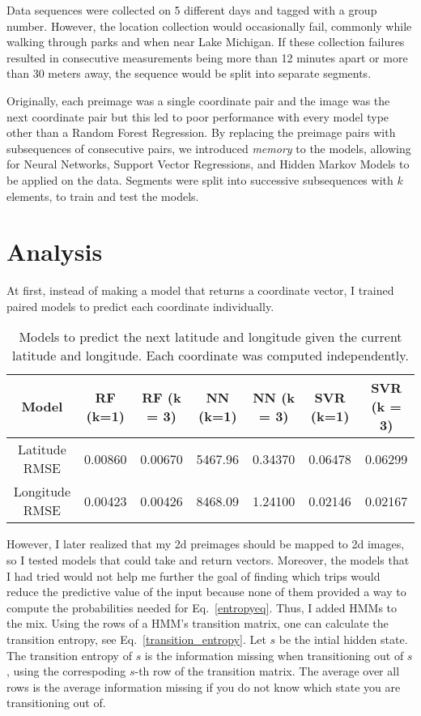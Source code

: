 \documentclass[11pt]{amsart}
\begin{document}
Data sequences were collected on 5 different days and tagged with a group number.
However, the location collection would occasionally fail, commonly while walking through parks and when near Lake Michigan.
If these collection failures resulted in consecutive measurements being more than 12 minutes apart or more than 30 meters away, the sequence would be split into separate segments.

Originally, each preimage was a single coordinate pair and the image was the next coordinate pair but this led to poor performance with every model type other than a Random Forest Regression.
By replacing the preimage pairs with subsequences of consecutive pairs, we introduced \emph{memory} to the models, allowing for Neural Networks, Support Vector Regressions, and Hidden Markov Models to be applied on the data.
Segments were split into successive subsequences with $k$ elements, to train and test the models.
\section{Analysis}

At first, instead of making a model that returns a coordinate vector, I trained paired models to predict each coordinate individually.
\begin{table}[h!]
\centering
\begin{tabular}{|c|c|c|c|c|c|c|}
\hline
Model & RF (k=1) & RF (k = 3) & NN (k=1) & NN (k = 3) & SVR (k=1) & SVR (k = 3)\\ \hline
Latitude RMSE & 0.00860 & 0.00670 & 5467.96 & 0.34370 & 0.06478 & 0.06299 \\ \hline
Longitude RMSE & 0.00423 & 0.00426 & 8468.09 & 1.24100 & 0.02146 & 0.02167 \\ \hline
\end{tabular}
\caption{Models to predict the next latitude and longitude given the current latitude and longitude.
Each coordinate was computed independently.}
\label{table1}
\end{table}

However, I later realized that my 2d preimages should be mapped to 2d images, so I tested models that could take and return vectors.
Moreover, the models that I had tried would not help me further the goal of finding which trips would reduce the predictive value of the input because none of them provided a way to compute the probabilities needed for Eq.~\ref{entropyeq}.
Thus, I added HMMs to the mix.
Using the rows of a HMM's transition matrix, one can calculate the transition entropy, see Eq.~\ref{transition_entropy}.
Let $s$ be the intial hidden state.
The transition entropy of $s$ is the information missing when transitioning out of $s$, using the correspoding $s$-th row of the transition matrix.
The average over all rows is the average information missing if you do not know which state you are transitioning out of.
\end{document}
